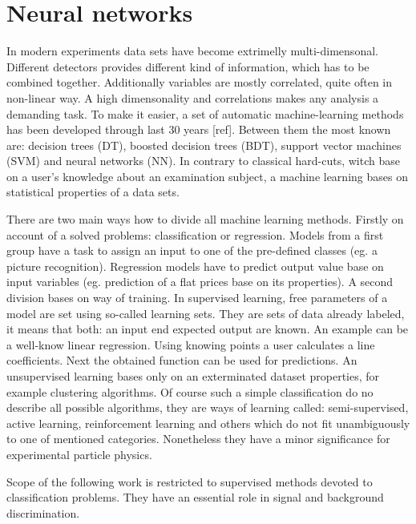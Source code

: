 \newcommand{\h}{$h(\vec{x})$}
\newcommand{\e}{\epsilon}
\chapter{Neural networks}\label{chapter:NN}
In modern experiments data sets have become extrimelly multi-dimensonal. Different detectors provides different kind of information, which has to be combined together. Additionally variables are mostly correlated, quite often in non-linear way. A high dimensonality and correlations makes any analysis a demanding task. To make it easier, a set of automatic machine-learning methods has been developed through last 30 years [ref]. Between them the most known are: decision trees (DT), boosted decision trees (BDT), support vector machines (SVM) and neural networks (NN). In contrary to classical hard-cuts, witch base on a user's knowledge about an examination subject, a machine learning bases on statistical properties of a data sets.

There are two main ways how to divide all machine learning methods. Firstly on account of a solved problems: classification or regression. Models from a first group have a task to assign an input to one of the pre-defined classes (eg. a picture recognition). Regression models have to predict output value base on input variables (eg. prediction of a flat prices base on its properties). A second division bases on way of training. In supervised learning, free parameters of a model are set using so-called learning sets. They are sets of data already labeled, it means that both: an input end expected output are known. An example can be a well-know linear regression. Using knowing points a user calculates a line coefficients. Next the obtained function can be used for predictions. An unsupervised learning bases only on an exterminated dataset properties, for example clustering algorithms. Of course such a simple classification do no describe all possible algorithms, they are ways of learning called: semi-supervised, active learning, reinforcement learning and others which do not fit unambiguously to one of mentioned categories. Nonetheless they have a minor significance for experimental particle physics.

Scope of the following work is restricted to supervised methods devoted to classification problems. They have an essential role in signal and background discrimination. 

